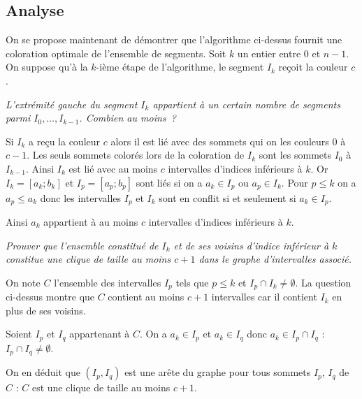\subsection{Analyse}
On se propose maintenant de démontrer que l'algorithme ci-dessus fournit une coloration optimale de l'ensemble de segments. 
Soit $k$ un entier entre $0$ et $n-1$. On suppose qu'à la $k$-ième étape de
l'algorithme, le segment $I_k$ reçoit la couleur $c$.
\begin{Exercise}\it
L'extrémité gauche du segment $I_k$ appartient à un certain nombre de segments parmi $I_0,\dots,I_{k-1}$. Combien au moins~?
\end{Exercise}  
\begin{Answer}
Si $I_k$ a reçu la couleur $c$ alors il est lié avec des sommets qui on les couleurs 0 à $c-1$. Les seuls sommets colorés lors de la coloration de $I_k$ sont les sommets $I_0$ à $I_{k-1}$. Ainsi $I_k$ est lié avec au moins $c$ intervalles d'indices inférieurs à $k$. Or $I_k=[a_k;b_k]$ et $I_p=[a_p;b_p]$ sont liés si on a $a_k\in I_p$ ou $a_p\in I_k$. Pour $p\le k$ on a $a_p\le a_k$ donc les intervalles $I_p$ et $I_k$ sont en conflit si et seulement si $a_k\in I_p$.

Ainsi $a_k$ appartient à au moins $c$ intervalles d'indices inférieurs à $k$.
\end{Answer}
\begin{Exercise}[label=ques:clique]\it
Prouver que l'ensemble constitué de $I_k$ et de ses voisins d'indice inférieur à $k$ constitue une clique de taille au moins $c+1$ dans le graphe d'intervalles associé.
\end{Exercise}  
\begin{Answer}
On note $C$ l'ensemble des intervalles $I_p$ tels que $p\le k$ et $I_p\cap I_k \ne \emptyset$.
La question ci-dessus montre que $C$ contient au moins $c+1$ intervalles car il contient $I_k$ en plus de ses voisins.

Soient $I_p$ et $I_q$ appartenant à $C$. On a $a_k\in I_p$ et $a_k\in I_q$ donc $a_k\in I_p\cap I_q$ : $I_p\cap I_q\ne \emptyset$.

On en déduit que $(I_p,I_q)$ est une arête du graphe pour tous sommets $I_p$, $I_q$ de $C$ : $C$ est une clique de taille au moins $c+1$.
\end{Answer}
